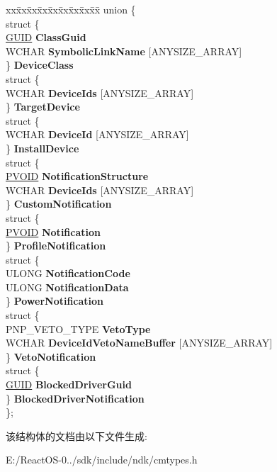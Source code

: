 \begin{DoxyCompactItemize}
\mbox{\label{struct___p_l_u_g_p_l_a_y___e_v_e_n_t___b_l_o_c_k_aa357fb9c4cb34506684b64650665345d}} 
\begin{tabbing}
xx\=xx\=xx\=xx\=xx\=xx\=xx\=xx\=xx\=\kill
union \{\\
\>struct \{\\
\>\>\hyperlink{interface_g_u_i_d}{GUID} {\bfseries ClassGuid}\\
\>\>WCHAR {\bfseries SymbolicLinkName} \mbox{[}ANYSIZE\_ARRAY\mbox{]}\\
\>\} {\bfseries DeviceClass}\\
\>struct \{\\
\>\>WCHAR {\bfseries DeviceIds} \mbox{[}ANYSIZE\_ARRAY\mbox{]}\\
\>\} {\bfseries TargetDevice}\\
\>struct \{\\
\>\>WCHAR {\bfseries DeviceId} \mbox{[}ANYSIZE\_ARRAY\mbox{]}\\
\>\} {\bfseries InstallDevice}\\
\>struct \{\\
\>\>\hyperlink{interfacevoid}{PVOID} {\bfseries NotificationStructure}\\
\>\>WCHAR {\bfseries DeviceIds} \mbox{[}ANYSIZE\_ARRAY\mbox{]}\\
\>\} {\bfseries CustomNotification}\\
\>struct \{\\
\>\>\hyperlink{interfacevoid}{PVOID} {\bfseries Notification}\\
\>\} {\bfseries ProfileNotification}\\
\>struct \{\\
\>\>ULONG {\bfseries NotificationCode}\\
\>\>ULONG {\bfseries NotificationData}\\
\>\} {\bfseries PowerNotification}\\
\>struct \{\\
\>\>PNP\_VETO\_TYPE {\bfseries VetoType}\\
\>\>WCHAR {\bfseries DeviceIdVetoNameBuffer} \mbox{[}ANYSIZE\_ARRAY\mbox{]}\\
\>\} {\bfseries VetoNotification}\\
\>struct \{\\
\>\>\hyperlink{interface_g_u_i_d}{GUID} {\bfseries BlockedDriverGuid}\\
\>\} {\bfseries BlockedDriverNotification}\\
\}; \\

\end{tabbing}\end{DoxyCompactItemize}


该结构体的文档由以下文件生成\+:\begin{DoxyCompactItemize}
\item 
E\+:/\+React\+O\+S-\/0../sdk/include/ndk/cmtypes.\+h\end{DoxyCompactItemize}
